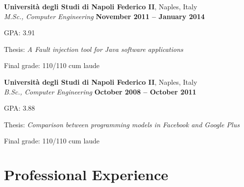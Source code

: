 \documentclass[margin,line]{resume}
\begin{document}
\begin{resume}
\textbf{Universit\`a degli Studi di Napoli Federico II}, Naples, Italy \vspace{1mm}\\%
\textsl{M.Sc., Computer Engineering} \hfill \textbf{November 2011 -- January 2014}\vspace{-3mm}\\\vspace{-1mm}%
\begin{list2}
	\item GPA: 3.91
	\item Thesis: \textsl{A Fault injection tool for Java software applications}
	\item Final grade: 110/110 cum laude
\end{list2}\vspace{-1.5mm}    


\textbf{Universit\`a degli Studi di Napoli Federico II}, Naples, Italy \vspace{1mm}\\%
\textsl{B.Sc., Computer Engineering} \hfill \textbf{October 2008 -- October 2011}\vspace{-3mm}\\\vspace{-1mm}%
\begin{list2}
	\item GPA: 3.88
	\item Thesis: \textsl{Comparison between programming models in Facebook and Google Plus}
        \item Final grade: 110/110 cum laude
\end{list2}\vspace{-1.5mm}    


\section{\mysidestyle Professional Experience}


\end{resume}
\end{document}
